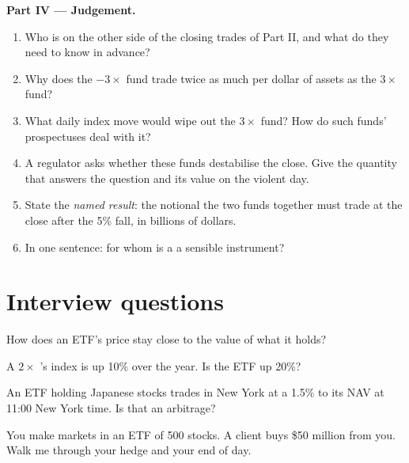 \begin{problem}
\medskip\noindent\textbf{Part IV --- Judgement.}
\begin{enumerate}[resume]
\item Who is on the other side of the closing trades of Part II, and what do
they need to know in advance?
\item Why does the $-3\times$ fund trade twice as much per dollar of assets
as the $3\times$ fund?
\item What daily index move would wipe out the $3\times$ fund? How do such
funds' prospectuses deal with it?
\item A regulator asks whether these funds destabilise the close. Give the
quantity that answers the question and its value on the violent day.
\item State the \emph{named result}: the notional the two funds together must
trade at the close after the 5\% fall, in billions of dollars.
\item In one sentence: for whom is a  a sensible instrument?
\end{enumerate}
\end{problem}

\section{Interview questions}

\begin{interviewq}\label{iq:m1:exchange-traded-funds:1}
How does an ETF's price stay close to the value of what it holds?
\end{interviewq}

\begin{interviewq}\label{iq:m1:exchange-traded-funds:2}
A $2\times$ 's index is up 10\% over the year. Is the ETF up
20\%?
\end{interviewq}

\begin{interviewq}\label{iq:m1:exchange-traded-funds:3}
An ETF holding Japanese stocks trades in New York at a 1.5\%  to its
NAV at 11:00 New York time. Is that an arbitrage?
\end{interviewq}

\begin{interviewq}\label{iq:m1:exchange-traded-funds:4}
You make markets in an ETF of 500 stocks. A client buys \$50 million from
you. Walk me through your hedge and your end of day.
\end{interviewq}

